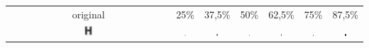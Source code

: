 \documentclass[a4paper,11pt]{article}
\begin{document}
      \begin{center}
      \begin{tabular}[p]{@{}ccccccc@{}}
        \centering

        original & 25\% & 37,5\% & 50\% & 62,5\% & 75\% & 87,5\% \\

        \includegraphics[width=0.05\textwidth]{assets/binarization/gray3_big.png}
        &
        \includegraphics[width=0.05\textwidth]{assets/binarization/h25t.png}
        &
        \includegraphics[width=0.05\textwidth]{assets/binarization/h38t.png}
        &
        \includegraphics[width=0.05\textwidth]{assets/binarization/h50t.png}
        &
        \includegraphics[width=0.05\textwidth]{assets/binarization/h63t.png}
        &
        \includegraphics[width=0.05\textwidth]{assets/binarization/h75t.png}
        &
        \includegraphics[width=0.05\textwidth]{assets/binarization/h88t.png}
        \\



\end{tabular}
\end{center}
\end{document}
